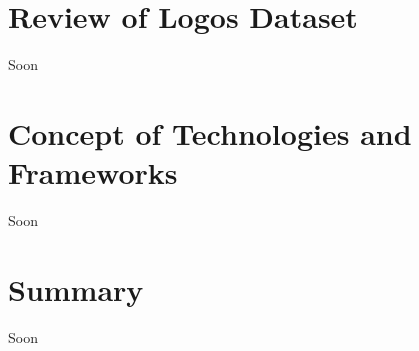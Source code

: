 \vspace{-0.3cm}




\section{Review of Logos Dataset}\label{sec:4.3}
\vspace{-0.5cm}
\noindent Soon

\vspace{-0.3cm}


\section{Concept of Technologies and Frameworks}\label{sec:4.3}
\vspace{-0.5cm}
\noindent Soon
 
\vspace{-0.3cm}


\section{Summary}\label{sec:4.4}
\vspace{-0.5cm}
\noindent Soon

\vspace{-0.3cm}



